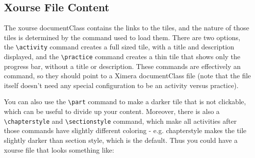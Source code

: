 \documentclass{ximera}
\begin{document}
\subsection*{Xourse File Content}
    The xourse documentClass contains the links to the tiles, and the nature of those tiles is determined by the command used to load them. There are two options, the \verb|\activity| command creates a full sized tile, with a title and description displayed, and the \verb|\practice| command creates a thin tile that shows only the progress bar, without a title or description. These commands are effectively an \verb|| command, so they should point to a Ximera documentClass file (note that the file itself doesn't need any special configuration to be an activity versus practice).
    
    You can also use the \verb|\part| command to make a darker tile that is not clickable, which can be useful to divide up your content. Moreover, there is also a \verb|\chapterstyle| and \verb|\sectionstyle| command, which make all activities after those commands have slightly different coloring - e.g. chapterstyle makes the tile slightly darker than section style, which is the default. Thus you could have a xourse file that looks something like:
    
\end{document}
